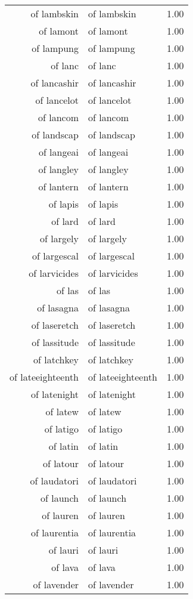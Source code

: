 \begin{table}[ht]
\begin{tabular}{rlr}
  of lambskin & of lambskin & 1.00 \\ 
  of lamont & of lamont & 1.00 \\ 
  of lampung & of lampung & 1.00 \\ 
  of lanc & of lanc & 1.00 \\ 
  of lancashir & of lancashir & 1.00 \\ 
  of lancelot & of lancelot & 1.00 \\ 
  of lancom & of lancom & 1.00 \\ 
  of landscap & of landscap & 1.00 \\ 
  of langeai & of langeai & 1.00 \\ 
  of langley & of langley & 1.00 \\ 
  of lantern & of lantern & 1.00 \\ 
  of lapis & of lapis & 1.00 \\ 
  of lard & of lard & 1.00 \\ 
  of largely & of largely & 1.00 \\ 
  of largescal & of largescal & 1.00 \\ 
  of larvicides & of larvicides & 1.00 \\ 
  of las & of las & 1.00 \\ 
  of lasagna & of lasagna & 1.00 \\ 
  of laseretch & of laseretch & 1.00 \\ 
  of lassitude & of lassitude & 1.00 \\ 
  of latchkey & of latchkey & 1.00 \\ 
  of lateeighteenth & of lateeighteenth & 1.00 \\ 
  of latenight & of latenight & 1.00 \\ 
  of latew & of latew & 1.00 \\ 
  of latigo & of latigo & 1.00 \\ 
  of latin & of latin & 1.00 \\ 
  of latour & of latour & 1.00 \\ 
  of laudatori & of laudatori & 1.00 \\ 
  of launch & of launch & 1.00 \\ 
  of lauren & of lauren & 1.00 \\ 
  of laurentia & of laurentia & 1.00 \\ 
  of lauri & of lauri & 1.00 \\ 
  of lava & of lava & 1.00 \\ 
  of lavender & of lavender & 1.00 \\ 

\end{tabular}
\end{table}
